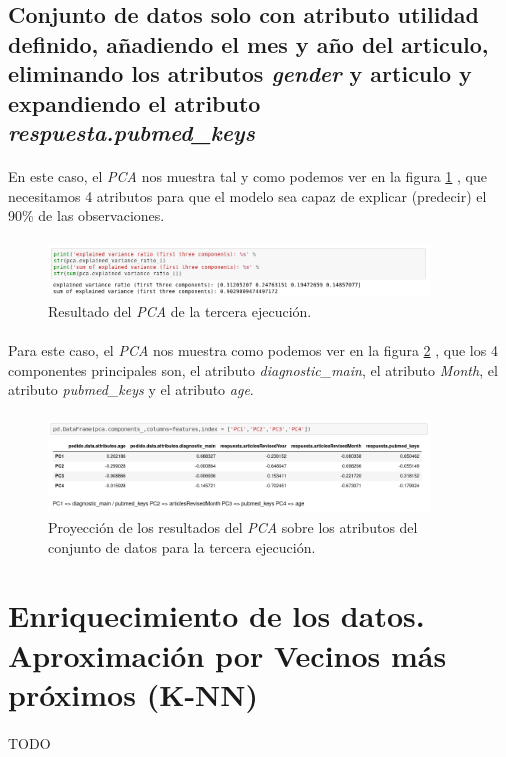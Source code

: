 \subsection{Conjunto de datos solo con atributo utilidad definido, añadiendo el mes y año del articulo, eliminando los atributos \textit{gender} y articulo y expandiendo el atributo \textit{respuesta.pubmed\_keys}}

\paragraph{}
En este caso, el \textit{PCA} nos muestra tal y como podemos ver en la figura \ref{pcaThreeResult} , que necesitamos 4 atributos para que el modelo sea capaz de explicar (predecir) el 90\% de las observaciones.

\paragraph{}
\begin{figure}[!htb]
  \centering
    \includegraphics[width=0.9\textwidth]{images/resultados_procesado_de_datos_pca3_result.png}
    \caption{Resultado del \textit{PCA} de la tercera ejecución.}
  \label{pcaThreeResult}
\end{figure}

\paragraph{}
Para este caso, el \textit{PCA} nos muestra como podemos ver en la figura \ref{pcaThreeAtributos} , que los 4 componentes principales son, el atributo \textit{diagnostic\_main}, el atributo \textit{Month}, el atributo \textit{pubmed\_keys} y el atributo \textit{age}.

\paragraph{}
\begin{figure}[!htb]
  \centering
    \includegraphics[width=0.9\textwidth]{images/resultados_procesado_de_datos_pca3_atributos.png}
    \caption{Proyección de los resultados del \textit{PCA} sobre los atributos del conjunto de datos para la tercera ejecución.}
  \label{pcaThreeAtributos}
\end{figure}

\section{Enriquecimiento de los datos. Aproximación por Vecinos más próximos (K-NN)}

\paragraph{}
TODO

